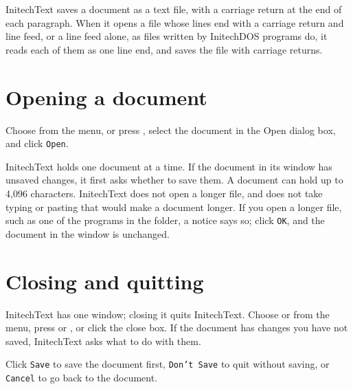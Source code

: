 
InitechText saves a document as a text file, with a carriage return at the
end of each paragraph.  When it opens a file whose lines end with a
carriage return and line feed, or a line feed alone, as files written by
InitechDOS programs do, it reads each of them as one line end, and saves
the file with carriage returns.

\section{Opening a document}
Choose  from the  menu, or press
, select the document in the Open dialog box, and click
\texttt{Open}.


InitechText holds one document at a time.  If the document in its window
has unsaved changes, it first asks whether to save them.  A document can
hold up to 4,096 characters.  InitechText does not open a longer file, and
does not take typing or pasting that would make a document longer.  If you
open a longer file, such as one of the programs in the  folder,
a notice says so; click \texttt{OK}, and the document in the window is
unchanged.


\section{Closing and quitting}
InitechText has one window; closing it quits InitechText.  Choose
 or  from the  menu, press
 or , or click the close box.  If the document has
changes you have not saved, InitechText asks what to do with them.


Click \texttt{Save} to save the document first, \texttt{Don't Save} to quit
without saving, or \texttt{Cancel} to go back to the document.

